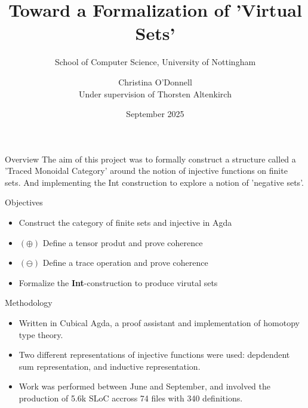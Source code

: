 \documentclass[aspectratio=169,16pt]{beamer}
\title{Toward a Formalization of 'Virtual Sets'}
\author{Christina O'Donnell\\ Under supervision of Thorsten Altenkirch}
\subtitle{School of Computer Science, University of Nottingham}
\date{September 2025}
\begin{document}
\begin{frame}
  \titlepage
\end{frame}

\begin{frame}{Overview}
  The aim of this project was to formally construct a structure called
  a 'Traced Monoidal Category' around the notion of injective
  functions on finite sets. And implementing the \textrm{Int}
  construction to explore a notion of 'negative sets'.

\begin{center}
\end{center}
\end{frame}

\begin{frame}{Objectives}
  \begin{itemize}
  \item Construct the category of finite sets and injective in Agda
  \item $(\oplus)$ Define a tensor produt and prove coherence
  \item $(\ominus)$ Define a trace operation and prove coherence
  \item Formalize the \textbf{Int}-construction to produce virutal sets
  \end{itemize}
\end{frame}

\begin{frame}{Methodology}
  \begin{itemize}
    \item Written in Cubical Agda, a proof assistant and
      implementation of homotopy type theory.
    \item Two different representations of injective functions were
      used: depdendent sum representation, and inductive representation.
    \item Work was performed between June and September, and involved
      the production of 5.6k SLoC accross 74 files with 340
      definitions.
  \end{itemize}
\end{frame}
\end{document}
